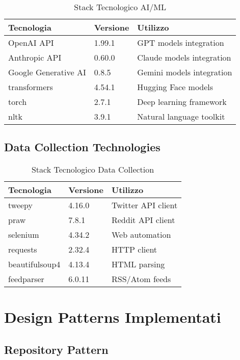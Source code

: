 \documentclass[12pt,a4paper]{report}
\begin{document}
\begin{table}[H]
\centering
\begin{tabular}{@{}lll@{}}
\toprule
\textbf{Tecnologia} & \textbf{Versione} & \textbf{Utilizzo} \\
\midrule
OpenAI API & 1.99.1 & GPT models integration \\
Anthropic API & 0.60.0 & Claude models integration \\
Google Generative AI & 0.8.5 & Gemini models integration \\
transformers & 4.54.1 & Hugging Face models \\
torch & 2.7.1 & Deep learning framework \\
nltk & 3.9.1 & Natural language toolkit \\
\bottomrule
\end{tabular}
\caption{Stack Tecnologico AI/ML}
\label{tab:ai-stack}
\end{table}

\subsection{Data Collection Technologies}

\begin{table}[H]
\centering
\begin{tabular}{@{}lll@{}}
\toprule
\textbf{Tecnologia} & \textbf{Versione} & \textbf{Utilizzo} \\
\midrule
tweepy & 4.16.0 & Twitter API client \\
praw & 7.8.1 & Reddit API client \\
selenium & 4.34.2 & Web automation \\
requests & 2.32.4 & HTTP client \\
beautifulsoup4 & 4.13.4 & HTML parsing \\
feedparser & 6.0.11 & RSS/Atom feeds \\
\bottomrule
\end{tabular}
\caption{Stack Tecnologico Data Collection}
\label{tab:datacollection-stack}
\end{table}

\section{Design Patterns Implementati}

\subsection{Repository Pattern}
\end{document}
